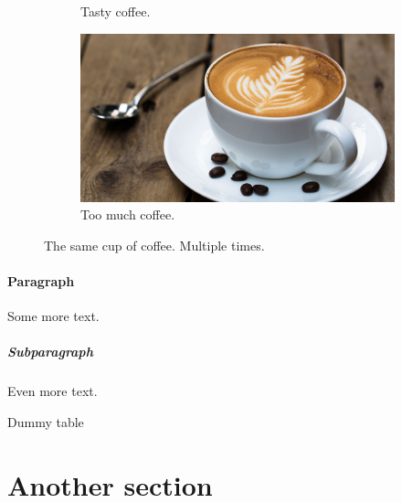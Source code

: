 \documentclass{article}
\begin{document}
\begin{figure}[h!]
\begin{subfigure}[b]{0.2\linewidth}
    \caption{Tasty coffee.}
  \end{subfigure}
  \begin{subfigure}[b]{0.5\linewidth}
    \includegraphics[width=\linewidth]{coffee.jpg}
    \caption{Too much coffee.}
  \end{subfigure}
  \caption{The same cup of coffee. Multiple times.}
  \label{fig:coffee3}
\end{figure}

\paragraph{Paragraph}

Some more text.

\subparagraph{Subparagraph}

Even more text.

\begin{table}
  \caption{Dummy table}
\end{table}

\section{Another section}

\begin{appendix}
  \listoffigures
  \listoftables
\end{appendix}

 

\end{document}
